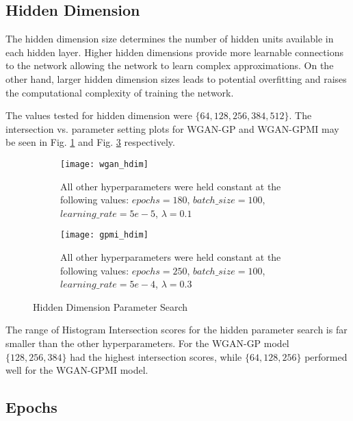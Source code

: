\subsection{Hidden Dimension}
\label{sec:hdim}

The hidden dimension size determines the number of hidden units available in each hidden layer. Higher hidden dimensions provide more learnable connections to the network allowing the network to learn complex approximations. On the other hand, larger hidden dimension sizes leads to potential overfitting and raises the computational complexity of training the network.

The values tested for hidden dimension were $\{64, 128, 256, 384, 512\}$. The intersection vs. parameter setting plots for WGAN-GP and WGAN-GPMI may be seen in Fig. \ref{fig:wgan_hdim} and Fig. \ref{fig:gpmi_hdim} respectively.

\begin{figure}[!htbp]
	\centering
	\begin{subfigure}{.7\textwidth}
		\texttt{[image: wgan\_hdim]}
	\end{subfigure}%
	\begin{subfigure}{.3\textwidth}
		\caption{
			All other hyperparameters were held constant at the following values: $epochs=180$, $batch\_size = 100$, $learning\_rate=5e-5$, $\lambda=0.1$
		}
		\label{fig:wgan_hdim}
	\end{subfigure}%

	\begin{subfigure}{.7\textwidth}
		\texttt{[image: gpmi\_hdim]}
	\end{subfigure}%
	\begin{subfigure}{.3\textwidth}
		\caption{
			All other hyperparameters were held constant at the following values: $epochs=250$, $batch\_size=100$, $learning\_rate=5e-4$, $\lambda=0.3$
		}
		\label{fig:gpmi_hdim}
	\end{subfigure}%
	\caption{Hidden Dimension Parameter Search}
\end{figure}


The range of Histogram Intersection scores for the hidden parameter search is far smaller than the other hyperparameters. For the WGAN-GP model $\{128, 256, 384\}$ had the highest intersection scores, while $\{64,128,256\}$ performed well for the WGAN-GPMI model.


\subsection{Epochs}
\label{sec:epoch}

